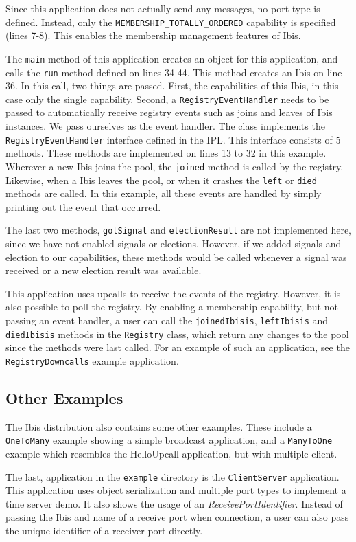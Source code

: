 Since this application does not actually send any messages, no port type
is defined. Instead, only the \texttt{MEMBERSHIP\_TOTALLY\_ORDERED}
capability is specified (lines 7-8). This enables the membership
management features of Ibis.

The \texttt{main} method of this application creates an object for this
application, and calls the \texttt{run} method defined on lines 34-44.
This method creates an Ibis on line 36. In this call, two things are
passed. First, the capabilities of this Ibis, in this case only the
single capability. Second, a \texttt{RegistryEventHandler} needs to be
passed to automatically receive registry events such as joins and leaves
of Ibis instances. We pass ourselves as the event handler. The class
implements the \texttt{RegistryEventHandler} interface defined in the
IPL. This interface consists of 5 methods. These methods are implemented
on lines 13 to 32 in this example. Wherever a new Ibis joins the pool,
the \texttt{joined} method is called by the registry. Likewise, when a
Ibis leaves the pool, or when it crashes the \texttt{left} or
\texttt{died} methods are called. In this example, all these events are
handled by simply printing out the event that occurred.

The last two methods, \texttt{gotSignal} and \texttt{electionResult} are
not implemented here, since we have not enabled signals or elections.
However, if we added signals and election to our capabilities, these
methods would be called whenever a signal was received or a new election
result was available.

This application uses upcalls to receive the events of the registry.
However, it is also possible to poll the registry. By enabling a
membership capability, but not passing an event handler, a user can call
the \texttt{joinedIbisis}, \texttt{leftIbisis} and \texttt{diedIbisis}
methods in the \texttt{Registry} class, which return any changes to the
pool since the methods were last called. For an example of such an
application, see the \texttt{RegistryDowncalls} example application.

\subsection{Other Examples}

The Ibis distribution also contains some other examples. These include
a \texttt{OneToMany} example showing a simple broadcast application, and a
\texttt{ManyToOne} example which resembles the HelloUpcall application,
but with multiple client.

The last, application in the \texttt{example} directory is
the \texttt{ClientServer} application. This application uses object
serialization and multiple port types to implement a time server demo.
It also shows the usage of an \emph{ReceivePortIdentifier}. Instead of
passing the Ibis and name of a receive port when connection, a user can
also pass the unique identifier of a receiver port directly.
